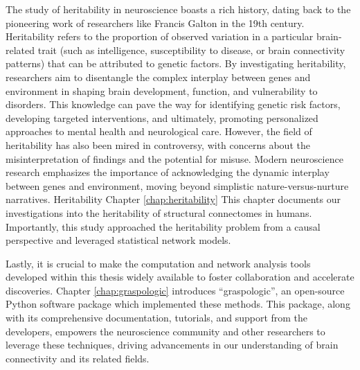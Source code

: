The study of heritability in neuroscience boasts a rich history, dating back to the pioneering work of researchers like Francis Galton in the 19th century. Heritability refers to the proportion of observed variation in a particular brain-related trait (such as intelligence, susceptibility to disease, or brain connectivity patterns) that can be attributed to genetic factors. By investigating heritability, researchers aim to disentangle the complex interplay between genes and environment in shaping brain development, function, and vulnerability to disorders. This knowledge can pave the way for identifying genetic risk factors, developing targeted interventions, and ultimately, promoting personalized approaches to mental health and neurological care. However, the field of heritability has also been mired in controversy, with concerns about the misinterpretation of findings and the potential for misuse. Modern neuroscience research emphasizes the importance of acknowledging the dynamic interplay between genes and environment, moving beyond simplistic nature-versus-nurture narratives. Heritability Chapter \ref{chap:heritability} This chapter documents our investigations into the heritability of structural connectomes in humans. Importantly, this study approached the heritability problem from a causal perspective and leveraged statistical network models.

Lastly, it is crucial to make the computation and network analysis tools developed within this thesis widely available to foster collaboration and accelerate discoveries. Chapter \ref{chap:graspologic} introduces ``graspologic'', an open-source Python software package which implemented these methods. This package, along with its comprehensive documentation, tutorials, and support from the developers, empowers the neuroscience community and other researchers to leverage these techniques, driving advancements in our understanding of brain connectivity and its related fields.